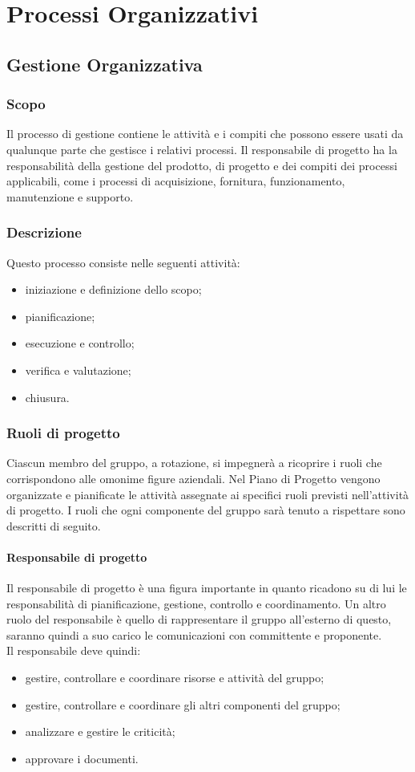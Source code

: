 \section{Processi Organizzativi}
	\subsection{Gestione Organizzativa}
		\subsubsection{Scopo}
		Il processo di gestione contiene le attività e i compiti  che possono essere usati da qualunque parte che gestisce i relativi processi. Il responsabile di  	progetto ha la responsabilità della gestione del prodotto, di progetto e dei compiti dei processi applicabili, come i processi di acquisizione, fornitura, funzionamento, manutenzione e supporto.
		\subsubsection{Descrizione}
		Questo processo consiste nelle seguenti attività:
		\begin{itemize}
			\item iniziazione e definizione dello scopo;
			\item pianificazione;
			\item esecuzione e controllo;
			\item verifica e valutazione;
			\item chiusura.
		\end{itemize}
		\subsubsection{Ruoli di progetto}
		Ciascun membro del gruppo, a rotazione, si impegnerà a ricoprire i  ruoli che corrispondono alle omonime figure aziendali. Nel Piano di Progetto 	vengono organizzate e pianificate le attività assegnate ai specifici ruoli previsti nell'attività di progetto. I ruoli che ogni componente del gruppo sarà tenuto a rispettare sono descritti di seguito.
			\paragraph{Responsabile di progetto}
			Il responsabile di progetto è una figura importante in quanto ricadono su di lui le responsabilità di pianificazione, gestione, controllo e coordinamento. Un altro ruolo del responsabile è quello di rappresentare il gruppo all'esterno di questo, saranno quindi a suo carico le comunicazioni con committente e proponente. \\
			Il responsabile deve quindi:
			\begin{itemize}
				\item gestire, controllare e coordinare risorse e attività del gruppo;
				\item  gestire, controllare e coordinare gli altri componenti del gruppo;
				\item analizzare e gestire le criticità;
				\item approvare i documenti.
			\end{itemize}
